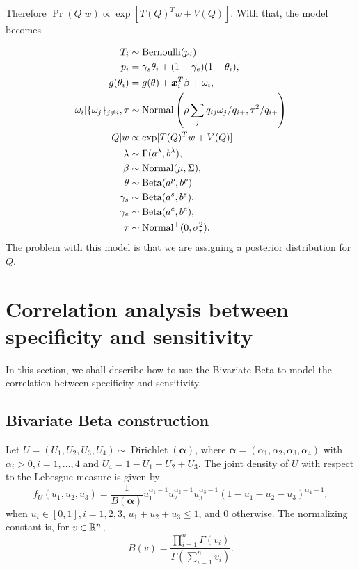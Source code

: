 Therefore $\Pr(Q|w) \propto \exp[T(Q)^Tw + V(Q)]$. With that, the model
becomes 

\begin{equation}
  \begin{aligned}
    T_i &\sim \operatorname{Bernoulli}(p_i) \\
    p_i &= \gamma_s\theta_i + (1-\gamma_e)(1 - \theta_i),  \\
    g(\theta_i) &= g(\theta) + \boldsymbol{x}_i^T\beta + \omega_i,  \\
    \omega_i|\{\omega_j\}_{j\neq i}, \tau &\sim \operatorname{Normal}\left(\rho\sum_j q_{ij}\omega_j/q_{i+}, \tau^2/q_{i+}\right) \\
    Q|w &\propto \exp[T(Q)^Tw + V(Q)] \\
    \lambda &\sim \Gamma(a^{\lambda}, b^{\lambda}), \\ 
    \beta &\sim \operatorname{Normal}(\mu, \Sigma), \\ 
    \theta &\sim \operatorname{Beta}(a^p, b^p) \\
    \gamma_s &\sim \operatorname{Beta}(a^s, b^s), \\
    \gamma_e &\sim \operatorname{Beta}(a^e, b^e), \\  
    \tau &\sim \operatorname{Normal}^+(0,\sigma^2_{\tau}).
  \end{aligned}  
\end{equation}
The problem with this model is that we are assigning a posterior distribution
for $Q$.

\section{Correlation analysis between specificity and sensitivity}

In this section, we shall describe how to use the Bivariate Beta
\cite[]{olkin2015constructions} to model the correlation between specificity
and sensitivity.

\subsection{Bivariate Beta construction}

Let $U = (U_1, U_2, U_3, U_4) \sim
\operatorname{Dirichlet}(\boldsymbol{\alpha})$, where $\boldsymbol{\alpha} =
(\alpha_1, \alpha_2, \alpha_3, \alpha_4)$ with $\alpha_i > 0, i = 1,\dots,4$
and $U_4 = 1 - U_1 + U_2 + U_3$. The joint density of $U$ with respect to the
Lebesgue measure is given by
\begin{equation}
  f_U(u_1, u_2, u_3) = \frac{1}{B(\boldsymbol{\alpha})}u_1^{\alpha_1-1}u_2^{\alpha_2-1}u_3^{\alpha_3-1}(1-u_1-u_2-u_3)^{\alpha_4-1}, 
\end{equation}
when $u_i \in [0,1], i = 1,2,3$, $u_1 + u_2 + u_3 \le 1$, and $0$ otherwise.
The normalizing constant is, for $v \in \mathbb{R}^n$,
$$B(v) = \frac{\prod_{i=1}^n \Gamma(v_i)}{\Gamma\left(\sum_{i=1}^n v_i\right)}.$$ 


